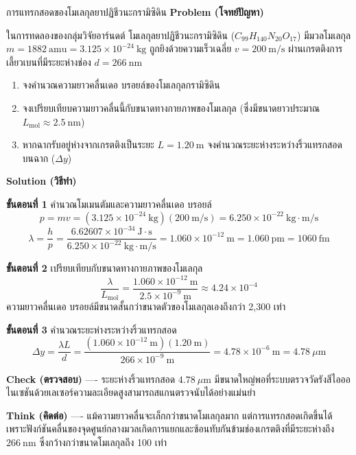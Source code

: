 \begin{psctbox}{การแทรกสอดของโมเลกุลยาปฏิชีวนะกรามิซิดิน}
\textbf{Problem (โจทย์ปัญหา)}

ในการทดลองของกลุ่มวิจัยอาร์นดต์ โมเลกุลยาปฏิชีวนะกรามิซิดิน ($C_{99}H_{140}N_{20}O_{17}$) มีมวลโมเลกุล $m = 1882~\text{amu} = 3.125 \times 10^{-24}~\text{kg}$ ถูกยิงด้วยความเร็วเฉลี่ย $v = 200~\text{m/s}$ ผ่านเกรตติงการเลี้ยวเบนที่มีระยะห่างช่อง $d = 266~\text{nm}$
\begin{enumerate}
    \item จงคำนวณความยาวคลื่นเดอ บรอยล์ของโมเลกุลกรามิซิดิน
    \item จงเปรียบเทียบความยาวคลื่นนี้กับขนาดทางกายภาพของโมเลกุล (ซึ่งมีขนาดยาวประมาณ $L_{\text{mol}} \approx 2.5~\text{nm}$)
    \item หากฉากรับอยู่ห่างจากเกรตติงเป็นระยะ $L = 1.20~\text{m}$ จงคำนวณระยะห่างระหว่างริ้วแทรกสอดบนฉาก ($\Delta y$)
\end{enumerate}

\textbf{Solution (วิธีทำ)}

\textbf{ขั้นตอนที่ 1} คำนวณโมเมนตัมและความยาวคลื่นเดอ บรอยล์
\begin{equation*}
p = m v = (3.125 \times 10^{-24}~\text{kg})(200~\text{m/s}) = 6.250 \times 10^{-22}~\text{kg}\cdot\text{m/s}
\end{equation*}
\begin{equation*}
\lambda = \frac{h}{p} = \frac{6.62607 \times 10^{-34}~\text{J}\cdot\text{s}}{6.250 \times 10^{-22}~\text{kg}\cdot\text{m/s}} = 1.060 \times 10^{-12}~\text{m} = 1.060~\text{pm} = 1060~\text{fm}
\end{equation*}

\textbf{ขั้นตอนที่ 2} เปรียบเทียบกับขนาดทางกายภาพของโมเลกุล
\begin{equation*}
\frac{\lambda}{L_{\text{mol}}} = \frac{1.060 \times 10^{-12}~\text{m}}{2.5 \times 10^{-9}~\text{m}} \approx 4.24 \times 10^{-4}
\end{equation*}
ความยาวคลื่นเดอ บรอยล์มีขนาดสั้นกว่าขนาดตัวของโมเลกุลเองถึงกว่า 2,300 เท่า

\textbf{ขั้นตอนที่ 3} คำนวณระยะห่างระหว่างริ้วแทรกสอด
\begin{equation*}
\Delta y = \frac{\lambda L}{d} = \frac{(1.060 \times 10^{-12}~\text{m})(1.20~\text{m})}{266 \times 10^{-9}~\text{m}} = 4.78 \times 10^{-6}~\text{m} = 4.78~\mu\text{m}
\end{equation*}

\textbf{Check (ตรวจสอบ)} ---- ระยะห่างริ้วแทรกสอด $4.78~\mu\text{m}$ มีขนาดใหญ่พอที่ระบบตรวจวัดรังสีไอออไนเซชันด้วยเลเซอร์ความละเอียดสูงสามารถสแกนตรวจนับได้อย่างแม่นยำ

\textbf{Think (คิดต่อ)} ---- แม้ความยาวคลื่นจะเล็กกว่าขนาดโมเลกุลมาก แต่การแทรกสอดเกิดขึ้นได้เพราะฟังก์ชันคลื่นของจุดศูนย์กลางมวลเกิดการแยกและซ้อนทับกันข้ามช่องเกรตติงที่มีระยะห่างถึง $266~\text{nm}$ ซึ่งกว้างกว่าขนาดโมเลกุลถึง 100 เท่า
\end{psctbox}

